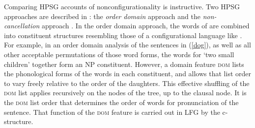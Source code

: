 
Comparing HPSG accounts of nonconfigurationality is instructive.   Two HPSG approaches are described in : the \emph{order domain} approach \citep{DS99a} and the \emph{non-cancellation} approach \citep{Bender2008a}. 
In the order domain approach, the words of  are combined into constituent structures resembling those of a configurational language like .  For example, in an order domain analysis of the  sentences in (\ref{dog}), as well as all other acceptable permutations of those word forms, the words for `two small children' together form an NP constituent.  However, a domain feature \textsc{dom} lists the phonological forms of the words in each constituent, and allows that list order to vary freely relative to the order of the daughters.  This effective shuffling of the \textsc{dom} list applies recursively on the nodes of the tree, up to the clausal node.  It is the \textsc{dom} list order that determines the order of words for  pronunciation of the sentence.  That function of the \textsc{dom} feature is carried out in LFG by the c-structure.    

